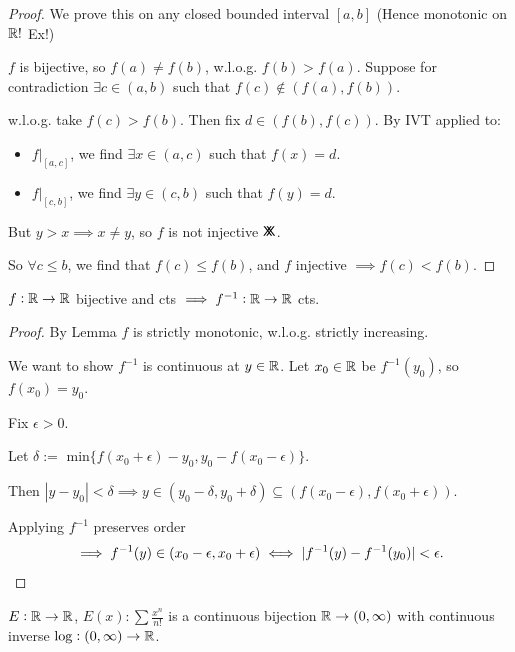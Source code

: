 \documentclass[10pt,twoside]{scrartcl}
\newcommand*{\cont}{%
  \mathsf{X}\mkern-8.5mu\mathsf{X}%
}
\begin{document}
\begin{proof}
We prove this on any closed bounded interval $[a,b]$ (Hence monotonic on $\mathbb{R}!$ Ex!)

$f$ is bijective, so $f(a) \neq f(b)$, w.l.o.g. $f(b) > f(a).$ Suppose for contradiction $\exists c \in (a,b)$ such that $f(c) \not\in (f(a),f(b)).$ 

w.l.o.g. take $f(c) > f(b)$. Then fix $d \in (f(b),f(c))$. By IVT applied to:
\begin{itemize} 
\item $f|_{[a,c]}$, we find $\exists x \in (a,c)$ such that $f(x) = d$. 
\item $f|_{[c,b]}$, we find $\exists y \in (c,b)$ such that $f(y) = d$.
	
\end{itemize}
But $y > x \implies x  \neq y$, so $f$ is not injective $\cont$. 

So $\forall c \leq b$, we find that $f(c) \leq f(b)$, and $f$ injective $\implies f(c) < f(b)$. 
\end{proof}\vspace*{5pt}

\begin{theorem}
	$f: \mathbb{R} \to \mathbb{R}$ bijective and cts $\implies f^{-1}: \mathbb{R} \to \mathbb{R}$ cts.
\end{theorem}
\begin{proof}
By Lemma $f$ is strictly monotonic, w.l.o.g. strictly increasing. 

We want to show $f^{-1}$ is continuous at $y\in\mathbb{R}$. Let $x_0 \in\mathbb{R}$ be $f^{-1}(y_0)$, so $f(x_0) = y_0$.

Fix $\epsilon > 0$.

Let $\delta :=$ min$\{f(x_0 + \epsilon) - y_0, y_0 - f(x_0 - \epsilon)\}$. 
 
 Then $|y -  y_0| < \delta \implies y \in (y_0 -\delta, y_0 + \delta) \subseteq (f(x_0 - \epsilon), f(x_0 + \epsilon))$. 
 
 Applying $f^{-1}$ preserves order \[\implies f^{-1}(y) \in (x_0 - \epsilon, x_0 + \epsilon) \iff |f^{-1}(y) - f^{-1}(y_0)| < \epsilon.\qedhere\]
\end{proof}\vspace*{5pt}

\begin{corollary}
$E:\mathbb{R} \to \mathbb{R}$, $E(x): \sum \frac{x^n}{n!}$ is a continuous bijection $\mathbb{R} \to (0,\infty)$ with continuous inverse $\log: (0,\infty) \to \mathbb{R}$. 	
\end{corollary}\vspace*{5pt}
\end{document}
